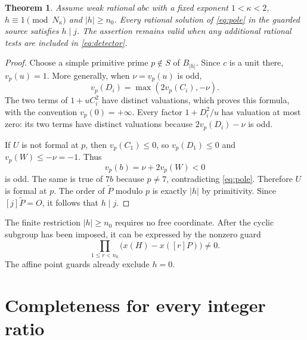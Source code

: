 \documentclass[11pt,a4paper]{article}
\newtheorem{theorem}{Theorem}[section]
\begin{document}
\begin{theorem}\label{thm:sound}
Assume weak rational $abc$ with a fixed exponent $1<\kappa<2$,
$h\equiv1\pmod{N_\kappa}$ and $|h|\ge n_0$.
Every rational solution of \eqref{eq:pole}
in the guarded source satisfies $h\mid j$. The assertion remains
valid when any additional rational tests are included in
\eqref{eq:detector}.
\end{theorem}
\begin{proof}
Choose a simple primitive prime $p\notin S$ of $B_{|h|}$.
Since $c$ is a unit there, $v_p(u)=1$.
More generally, when $\nu=v_p(u)$ is odd,
\[
                  v_p(D_i)=\max(2v_p(C_i),-\nu).
\]
The two terms of $1+uC_i^2$ have distinct valuations, which proves
this formula, with the convention $v_p(0)=+\infty$.
Every factor $1+D_i^2/u$ has valuation at most zero: its two terms
have distinct valuations because $2v_p(D_i)-\nu$ is odd.

If $U$ is not formal at $p$, then $v_p(C_1)\le0$, so
$v_p(D_1)\le0$ and $v_p(W)\le-\nu=-1$. Thus
\[
                  v_p(b)=\nu+2v_p(W)<0
\]
is odd. The same is true of $7b$ because $p\ne7$, contradicting
\eqref{eq:pole}. Therefore $U$ is formal at $p$.
The order of $\widetilde P$ modulo $p$ is exactly $|h|$ by
primitivity. Since $[j]\widetilde P=O$, it follows that $h\mid j$.
\end{proof}

The finite restriction $|h|\ge n_0$ requires no free coordinate.
After the cyclic subgroup has been imposed, it can be expressed by
the nonzero guard
\[
                 \prod_{1\le r<n_0}\bigl(x(H)-x([r]P)\bigr)\ne0.
\]
The affine point guards already exclude $h=0$.

\section{Completeness for every integer ratio}
\end{document}
